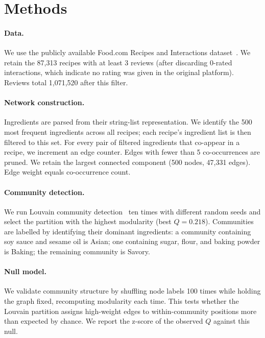 \documentclass[9pt,twocolumn]{pnas-new}
\begin{document}
\section*{Methods}

\paragraph{Data.}
We use the publicly available Food.com Recipes and Interactions dataset~\cite{majumder2019generating}. We retain the 87,313 recipes with at least 3 reviews (after discarding 0-rated interactions, which indicate no rating was given in the original platform). Reviews total 1,071,520 after this filter.

\paragraph{Network construction.}
Ingredients are parsed from their string-list representation. We identify the 500 most frequent ingredients across all recipes; each recipe's ingredient list is then filtered to this set. For every pair of filtered ingredients that co-appear in a recipe, we increment an edge counter. Edges with fewer than 5 co-occurrences are pruned. We retain the largest connected component (500 nodes, 47,331 edges). Edge weight equals co-occurrence count.

\paragraph{Community detection.}
We run Louvain community detection~\cite{blondel2008fast} ten times with different random seeds and select the partition with the highest modularity (best $Q = 0.218$). Communities are labelled by identifying their dominant ingredients: a community containing soy sauce and sesame oil is Asian; one containing sugar, flour, and baking powder is Baking; the remaining community is Savory.

\paragraph{Null model.}
We validate community structure by shuffling node labels 100 times while holding the graph fixed, recomputing modularity each time. This tests whether the Louvain partition assigns high-weight edges to within-community positions more than expected by chance. We report the z-score of the observed $Q$ against this null.
\end{document}
